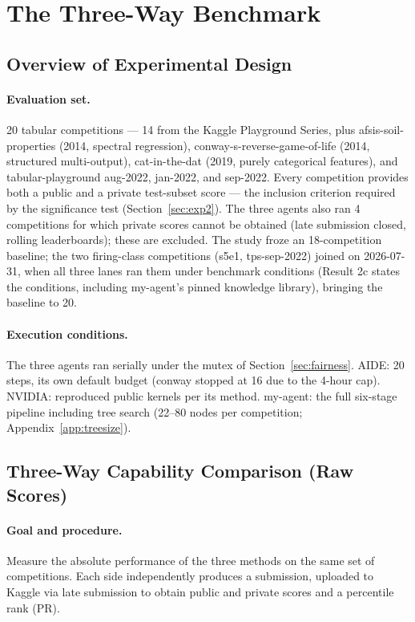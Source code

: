\documentclass[11pt,a4paper]{article}
\begin{document}
\section{The Three-Way Benchmark}

\subsection{Overview of Experimental Design}

\paragraph{Evaluation set.} 20 tabular competitions --- 14 from the Kaggle Playground Series, plus afsis-soil-properties (2014, spectral regression), conway-s-reverse-game-of-life (2014, structured multi-output), cat-in-the-dat (2019, purely categorical features), and tabular-playground aug-2022, jan-2022, and sep-2022. Every competition provides both a public and a private test-subset score --- the inclusion criterion required by the significance test (Section~\ref{sec:exp2}). The three agents also ran 4 competitions for which private scores cannot be obtained (late submission closed, rolling leaderboards); these are excluded. The study froze an 18-competition baseline; the two firing-class competitions (s5e1, tps-sep-2022) joined on 2026-07-31, when all three lanes ran them under benchmark conditions (Result 2c states the conditions, including my-agent's pinned knowledge library), bringing the baseline to 20.

\paragraph{Execution conditions.} The three agents ran serially under the mutex of Section~\ref{sec:fairness}. AIDE: 20 steps, its own default budget (conway stopped at 16 due to the 4-hour cap). NVIDIA: reproduced public kernels per its method. my-agent: the full six-stage pipeline including tree search (22--80 nodes per competition; Appendix~\ref{app:treesize}).

\subsection{Three-Way Capability Comparison (Raw Scores)}
\label{sec:exp1}

\paragraph{Goal and procedure.} Measure the absolute performance of the three methods on the same set of competitions. Each side independently produces a submission, uploaded to Kaggle via late submission to obtain public and private scores and a percentile rank (PR).
\end{document}
